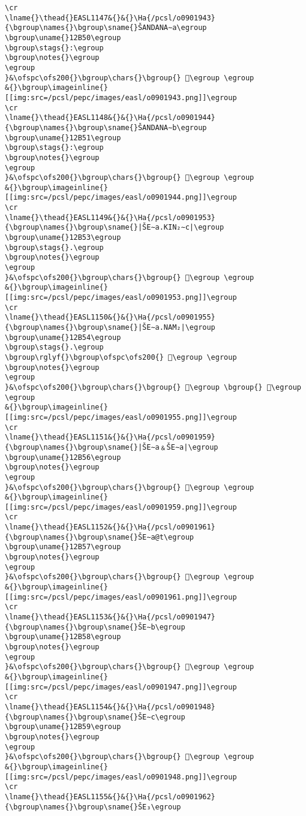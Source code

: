 \begin{verbatim}
\cr
\lname{}\thead{}EASL1147&{}&{}\Ha{/pcsl/o0901943}{\bgroup\names{}\bgroup\sname{}ŠANDANA∼a\egroup
\bgroup\uname{}12B50\egroup
\bgroup\stags{}:\egroup
\bgroup\notes{}\egroup
\egroup
}&\ofspc\ofs200{}\bgroup\chars{}\bgroup{} 𒭐\egroup \egroup
&{}\bgroup\imageinline{}[[img:src=/pcsl/pepc/images/easl/o0901943.png]]\egroup
\cr
\lname{}\thead{}EASL1148&{}&{}\Ha{/pcsl/o0901944}{\bgroup\names{}\bgroup\sname{}ŠANDANA∼b\egroup
\bgroup\uname{}12B51\egroup
\bgroup\stags{}:\egroup
\bgroup\notes{}\egroup
\egroup
}&\ofspc\ofs200{}\bgroup\chars{}\bgroup{} 𒭑\egroup \egroup
&{}\bgroup\imageinline{}[[img:src=/pcsl/pepc/images/easl/o0901944.png]]\egroup
\cr
\lname{}\thead{}EASL1149&{}&{}\Ha{/pcsl/o0901953}{\bgroup\names{}\bgroup\sname{}|ŠE∼a.KIN₂∼c|\egroup
\bgroup\uname{}12B53\egroup
\bgroup\stags{}.\egroup
\bgroup\notes{}\egroup
\egroup
}&\ofspc\ofs200{}\bgroup\chars{}\bgroup{} 𒭓\egroup \egroup
&{}\bgroup\imageinline{}[[img:src=/pcsl/pepc/images/easl/o0901953.png]]\egroup
\cr
\lname{}\thead{}EASL1150&{}&{}\Ha{/pcsl/o0901955}{\bgroup\names{}\bgroup\sname{}|ŠE∼a.NAM₂|\egroup
\bgroup\uname{}12B54\egroup
\bgroup\stags{}.\egroup
\bgroup\rglyf{}\bgroup\ofspc\ofs200{} 𒭔\egroup \egroup
\bgroup\notes{}\egroup
\egroup
}&\ofspc\ofs200{}\bgroup\chars{}\bgroup{} 𒭔\egroup \bgroup{} 𒭕\egroup \egroup
&{}\bgroup\imageinline{}[[img:src=/pcsl/pepc/images/easl/o0901955.png]]\egroup
\cr
\lname{}\thead{}EASL1151&{}&{}\Ha{/pcsl/o0901959}{\bgroup\names{}\bgroup\sname{}|ŠE∼a﹠ŠE∼a|\egroup
\bgroup\uname{}12B56\egroup
\bgroup\notes{}\egroup
\egroup
}&\ofspc\ofs200{}\bgroup\chars{}\bgroup{} 𒭖\egroup \egroup
&{}\bgroup\imageinline{}[[img:src=/pcsl/pepc/images/easl/o0901959.png]]\egroup
\cr
\lname{}\thead{}EASL1152&{}&{}\Ha{/pcsl/o0901961}{\bgroup\names{}\bgroup\sname{}ŠE∼a@t\egroup
\bgroup\uname{}12B57\egroup
\bgroup\notes{}\egroup
\egroup
}&\ofspc\ofs200{}\bgroup\chars{}\bgroup{} 𒭗\egroup \egroup
&{}\bgroup\imageinline{}[[img:src=/pcsl/pepc/images/easl/o0901961.png]]\egroup
\cr
\lname{}\thead{}EASL1153&{}&{}\Ha{/pcsl/o0901947}{\bgroup\names{}\bgroup\sname{}ŠE∼b\egroup
\bgroup\uname{}12B58\egroup
\bgroup\notes{}\egroup
\egroup
}&\ofspc\ofs200{}\bgroup\chars{}\bgroup{} 𒭘\egroup \egroup
&{}\bgroup\imageinline{}[[img:src=/pcsl/pepc/images/easl/o0901947.png]]\egroup
\cr
\lname{}\thead{}EASL1154&{}&{}\Ha{/pcsl/o0901948}{\bgroup\names{}\bgroup\sname{}ŠE∼c\egroup
\bgroup\uname{}12B59\egroup
\bgroup\notes{}\egroup
\egroup
}&\ofspc\ofs200{}\bgroup\chars{}\bgroup{} 𒭙\egroup \egroup
&{}\bgroup\imageinline{}[[img:src=/pcsl/pepc/images/easl/o0901948.png]]\egroup
\cr
\lname{}\thead{}EASL1155&{}&{}\Ha{/pcsl/o0901962}{\bgroup\names{}\bgroup\sname{}ŠE₃\egroup

\end{verbatim}
